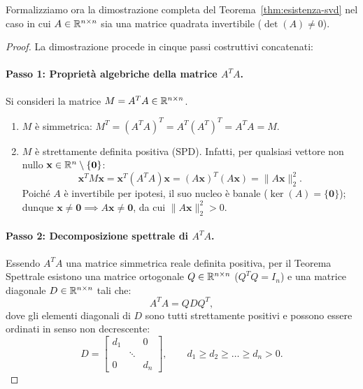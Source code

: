 Formalizziamo ora la dimostrazione completa del Teorema~\ref{thm:esistenza-svd} nel caso in cui $A \in \mathbb{R}^{n \times n}$ sia una matrice quadrata invertibile ($\det(A) \neq 0$).

\begin{proof}
La dimostrazione procede in cinque passi costruttivi concatenati:

\paragraph{Passo 1: Propriet\`a algebriche della matrice $A^T A$.}
Si consideri la matrice $M = A^T A \in \mathbb{R}^{n \times n}$.
\begin{enumerate}
    \item $M$ \`e simmetrica: $M^T = (A^T A)^T = A^T (A^T)^T = A^T A = M$.
    \item $M$ \`e strettamente definita positiva (SPD). Infatti, per qualsiasi vettore non nullo $\mathbf{x} \in \mathbb{R}^n \setminus \{\mathbf{0}\}$:
    \begin{equation}
        \mathbf{x}^T M \mathbf{x} = \mathbf{x}^T (A^T A) \mathbf{x} = (A\mathbf{x})^T (A\mathbf{x}) = \|A\mathbf{x}\|_2^2.
    \end{equation}
    Poich\'e $A$ \`e invertibile per ipotesi, il suo nucleo \`e banale ($\ker(A) = \{\mathbf{0}\}$); dunque $\mathbf{x} \neq \mathbf{0} \implies A\mathbf{x} \neq \mathbf{0}$, da cui $\|A\mathbf{x}\|_2^2 > 0$.
\end{enumerate}

\paragraph{Passo 2: Decomposizione spettrale di $A^T A$.}
Essendo $A^T A$ una matrice simmetrica reale definita positiva, per il Teorema Spettrale esistono una matrice ortogonale $Q \in \mathbb{R}^{n \times n}$ ($Q^T Q = I_n$) e una matrice diagonale $D \in \mathbb{R}^{n \times n}$ tali che:
\begin{equation}
    A^T A = Q D Q^T,
\end{equation}
dove gli elementi diagonali di $D$ sono tutti strettamente positivi e possono essere ordinati in senso non decrescente:
\begin{equation}
    D = \begin{bmatrix}
        d_1 & & 0 \\
        & \ddots & \\
        0 & & d_n
    \end{bmatrix}, \qquad d_1 \ge d_2 \ge \dots \ge d_n > 0.
\end{equation}


\end{proof}
